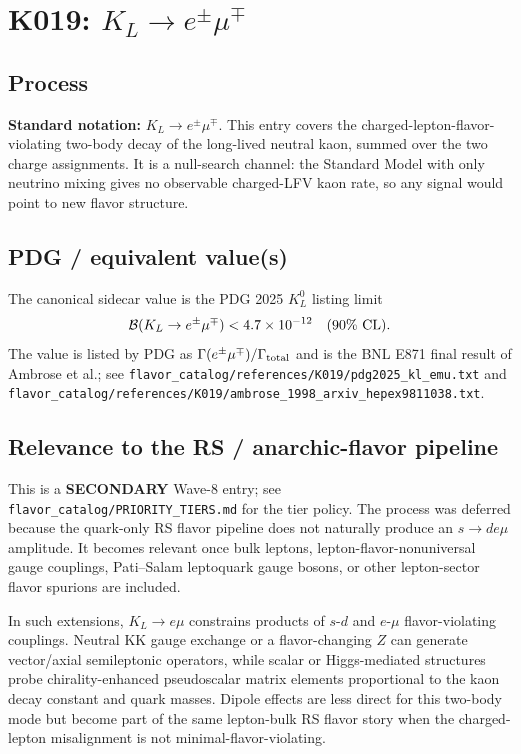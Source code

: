 
\section{K019: \(K_L \to e^{\pm}\mu^{\mp}\)}

\subsection*{Process}
\textbf{Standard notation:} \(K_L \to e^{\pm}\mu^{\mp}\).  This entry covers
the charged-lepton-flavor-violating two-body decay of the long-lived neutral
kaon, summed over the two charge assignments.  It is a null-search channel:
the Standard Model with only neutrino mixing gives no observable charged-LFV
kaon rate, so any signal would point to new flavor structure.

\subsection*{PDG / equivalent value(s)}
The canonical sidecar value is the PDG 2025 \(K_L^0\) listing limit
\[
  {\cal B}(K_L\to e^{\pm}\mu^{\mp}) < 4.7\times 10^{-12}
  \quad (90\%~{\rm CL}).
\]
The value is listed by PDG as \(\Gamma(e^{\pm}\mu^{\mp})/\Gamma_{\rm total}\)
and is the BNL E871 final result of Ambrose et al.; see
\texttt{flavor\_catalog/references/K019/pdg2025\_kl\_emu.txt} and
\texttt{flavor\_catalog/references/K019/ambrose\_1998\_arxiv\_hepex9811038.txt}.

\subsection*{Relevance to the RS / anarchic-flavor pipeline}
This is a \textbf{SECONDARY} Wave-8 entry; see
\texttt{flavor\_catalog/PRIORITY\_TIERS.md} for the tier policy.  The process
was deferred because the quark-only RS flavor pipeline does not naturally
produce an \(s\to d e\mu\) amplitude.  It becomes relevant once bulk leptons,
lepton-flavor-nonuniversal gauge couplings, Pati--Salam leptoquark gauge
bosons, or other lepton-sector flavor spurions are included.

In such extensions, \(K_L\to e\mu\) constrains products of \(s\)-\(d\) and
\(e\)-\(\mu\) flavor-violating couplings.  Neutral KK gauge exchange or a
flavor-changing \(Z\) can generate vector/axial semileptonic operators, while
scalar or Higgs-mediated structures probe chirality-enhanced pseudoscalar
matrix elements proportional to the kaon decay constant and quark masses.
Dipole effects are less direct for this two-body mode but become part of the
same lepton-bulk RS flavor story when the charged-lepton misalignment is not
minimal-flavor-violating.

